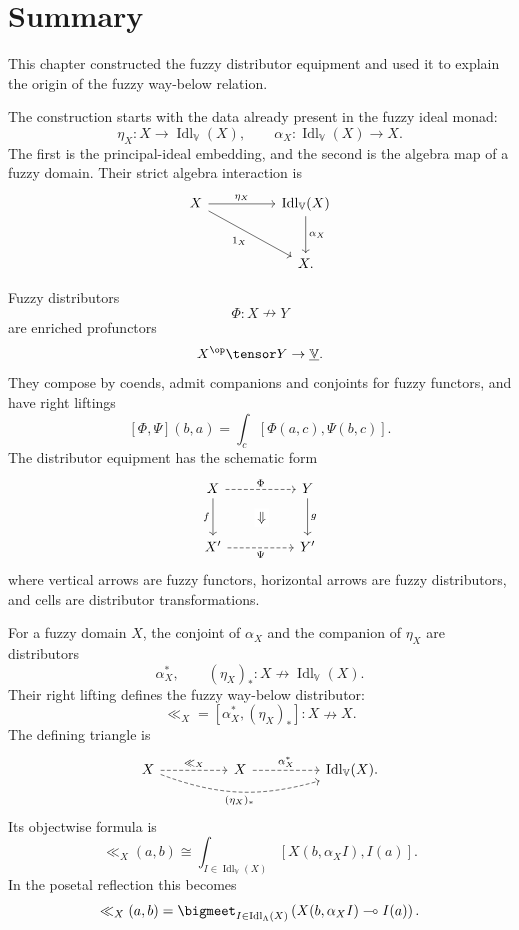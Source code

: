 \section{Summary}
\label{sec:summary-fuzzy-distributors-way-below}

This chapter constructed the fuzzy distributor equipment and used it to explain
the origin of the fuzzy way-below relation.

The construction starts with the data already present in the fuzzy ideal monad:
\[
    \eta_X:X\to\operatorname{Idl}_{\mathbb V}(X),
    \qquad
    \alpha_X:\operatorname{Idl}_{\mathbb V}(X)\to X.
\]
The first is the principal-ideal embedding, and the second is the algebra map of a
fuzzy domain. Their strict algebra interaction is
\[
\begin{tikzcd}[column sep=huge,row sep=large]
X
    \ar[r,"\eta_X"]
    \ar[dr,"1_X"']
&
\operatorname{Idl}_{\mathbb V}(X)
    \ar[d,"\alpha_X"]
\\
&
X.
\end{tikzcd}
\]

Fuzzy distributors
\[
    \Phi:X\nrightarrow Y
\]
are enriched profunctors
\[
    X^{\op}\tensor Y\to\underline{\mathbb V}.
\]
They compose by coends, admit companions and conjoints for fuzzy functors, and
have right liftings
\[
    [\Phi,\Psi](b,a)
    =
    \int_c
    [\Phi(a,c),\Psi(b,c)].
\]
The distributor equipment has the schematic form
\[
\begin{tikzcd}[column sep=huge,row sep=large]
X
    \ar[d,"f"']
    \ar[r,dashed,"\Phi"]
&
Y
    \ar[d,"g"]
\\
X'
    \ar[r,dashed,"\Psi"']
&
Y'
\ar[phantom,from=1-2,to=2-1,"\Downarrow" description]
\end{tikzcd}
\]
where vertical arrows are fuzzy functors, horizontal arrows are fuzzy
distributors, and cells are distributor transformations.

For a fuzzy domain \(X\), the conjoint of \(\alpha_X\) and the companion of
\(\eta_X\) are distributors
\[
    \alpha_X^\ast,
    \qquad
    (\eta_X)_\ast
    :
    X\nrightarrow \operatorname{Idl}_{\mathbb V}(X).
\]
Their right lifting defines the fuzzy way-below distributor:
\[
    \ll_X
    =
    [\alpha_X^\ast,(\eta_X)_\ast]
    :
    X\nrightarrow X.
\]
The defining triangle is
\[
\begin{tikzcd}[column sep=huge,row sep=large]
X
    \ar[r,dashed,"\ll_X"]
    \ar[rr,bend right=18,dashed,"{(\eta_X)_\ast}"']
&
X
    \ar[r,dashed,"\alpha_X^\ast"]
&
\operatorname{Idl}_{\mathbb V}(X).
\end{tikzcd}
\]
Its objectwise formula is
\[
    \ll_X(a,b)
    \cong
    \int_{I\in \operatorname{Idl}_{\mathbb V}(X)}
    \left[
        X(b,\alpha_X I),
        I(a)
    \right].
\]
In the posetal reflection this becomes
\[
    \ll_X(a,b)
    =
    \bigmeet_{I\in\operatorname{Idl}_\Lambda(X)}
    \left(
        X(b,\alpha_X I)\multimap I(a)
    \right).
\]


